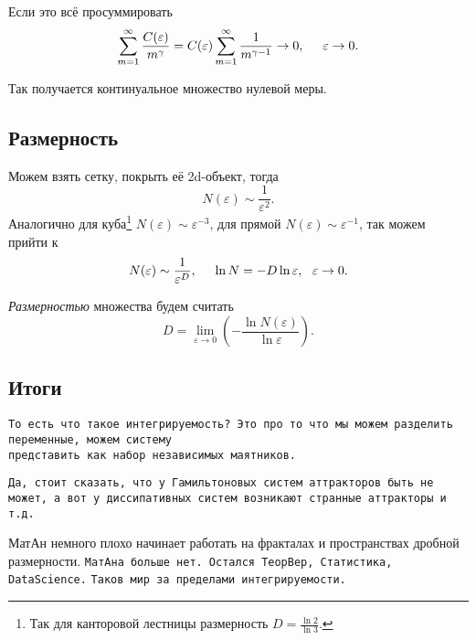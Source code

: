  Если это всё просуммировать
 \begin{equation*}
     \sum_{m=1}^{\infty} \frac{C(\varepsilon)}{m^\gamma} = C(\varepsilon) \sum_{m=1}^{\infty} \frac{1}{m^{\gamma-1}} \to 0, \hspace{5 mm} \varepsilon \to 0.
 \end{equation*}

 Так получается континуальное множество нулевой меры.


 \subsection{Размерность}
 
 Можем взять сетку, покрыть её 2d-объект, тогда
 \begin{equation*}
     N(\varepsilon) \sim \frac{1}{\varepsilon^2}.
 \end{equation*}
Аналогично для куба\footnote{
    Так для канторовой лестницы размерность $D = \frac{\ln 2}{\ln 3}$.
}  $N(\varepsilon) \sim \varepsilon^{-3}$, для прямой $N(\varepsilon) \sim \varepsilon^{-1}$, так можем прийти к
\begin{equation*}
    N(\varepsilon) \sim \frac{1}{\varepsilon^D},
    \hspace{5 mm}
    \ln N = - D \ln \varepsilon, \ \ \varepsilon \to 0.
\end{equation*}

\begin{to_def}
    \textit{Размерностью} множества будем считать
    \begin{equation*}
        D = \lim_{\varepsilon \to 0} \left(
            - \frac{\ln N(\varepsilon)}{\ln \varepsilon}
        \right).
    \end{equation*}
\end{to_def}

\subsection{Итоги}

\texttt{То есть что такое интегрируемость? Это про то что мы можем разделить переменные, можем систему\\ представить как набор независимых маятников.} 

\texttt{Да, стоит сказать, что у Гамильтоновых систем аттракторов быть не может, а вот у диссипативных систем возникают странные аттракторы и т.д.} 

МатАн немного плохо начинает работать на фракталах и пространствах дробной размерности. \texttt{МатАна больше нет. Остался ТеорВер, Статистика, DataScience.} \texttt{Таков мир за пределами интегрируемости.} 
